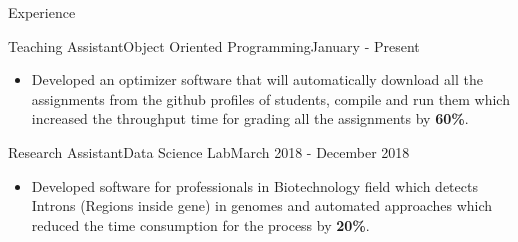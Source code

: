 \documentclass[]{mcdowellcv}
\begin{document}
	\begin{cvsection}{Experience}
		\begin{cvsubsection}{Teaching Assistant}{Object Oriented Programming}{January - Present}
			\begin{itemize}
				\item Developed an optimizer software that will automatically download all the assignments from the github profiles of students, compile and run them which increased the throughput time for grading all the assignments by \textbf{60\%}. 
			\end{itemize}
		\end{cvsubsection}
		\vspace{-3mm}
		\begin{cvsubsection}{Research Assistant}{Data Science Lab}{March 2018 - December 2018}	
			\begin{itemize}
				\item Developed software for professionals in Biotechnology field which detects Introns (Regions inside gene) in genomes and automated approaches which reduced the time consumption for the process by \textbf{20\%}.
			\end{itemize}
		\end{cvsubsection}
	\end{cvsection}
	\vspace{-4mm}
	
\end{document}
